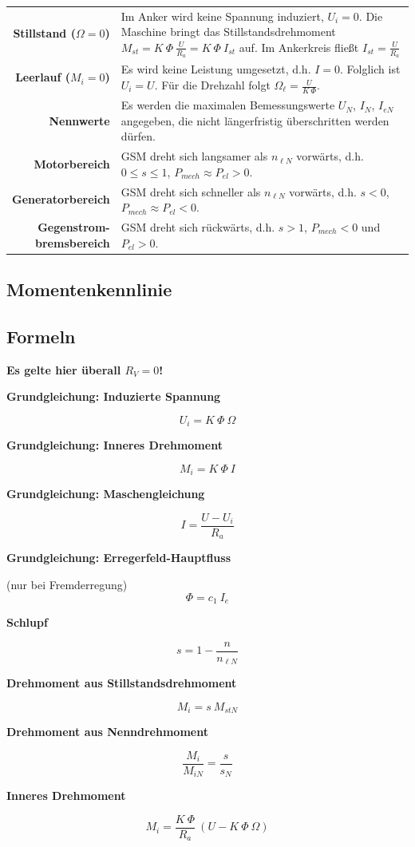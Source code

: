 \documentclass[11pt]{article}
\newcommand{\fancyformula}[2]{
	\small
	\raggedright\sffamily\textbf{#1}
	#2
}
\begin{document}
\begin{center}
\bgroup
\begin{longtable}{r p{12cm}}
	\textbf{Stillstand ($\Omega = 0$)} & Im Anker wird keine Spannung induziert, $U_i = 0$. Die Maschine bringt das Stillstandsdrehmoment $M_{st} = K ~ \Phi ~ \frac{U}{R_a} = K ~ \Phi ~ I_{st}$ auf. Im Ankerkreis fließt $I_{st} = \frac{U}{R_a}$ \\
	\textbf{Leerlauf ($M_i = 0$)} & Es wird keine Leistung umgesetzt, d.h. $I = 0$. Folglich ist $U_i = U$. Für die Drehzahl folgt $\Omega_\ell = \frac{U}{K ~ \Phi}$. \\
	\textbf{Nennwerte} & Es werden die maximalen Bemessungswerte $U_N$, $I_N$, $I_{eN}$ angegeben, die nicht längerfristig überschritten werden dürfen. \\
	\textbf{Motorbereich} & GSM dreht sich langsamer als $n_{\ell N}$ vorwärts, d.h. $0 \leq s \leq 1$, $P_{mech} \approx P_{el} > 0$. \\
	\textbf{Generatorbereich} & GSM dreht sich schneller als $n_{\ell N}$ vorwärts, d.h. $s < 0$, $P_{mech} \approx P_{el} < 0$. \\
	\pbox{20cm}{\textbf{Gegenstrom-} \\ \textbf{bremsbereich}} & GSM dreht sich rückwärts, d.h. $s > 1$, $P_{mech} < 0$ und $P_{el} > 0$.
\end{longtable}
\egroup
\end{center}

\subsection*{Momentenkennlinie}

\subsection*{Formeln}
\textbf{Es gelte hier überall $R_V = 0$!}

\begin{multicols}{2}
\fancyformula{Grundgleichung: Induzierte Spannung}{
	\[
		U_i = K ~ \Phi ~ \Omega
	\]
}

\fancyformula{Grundgleichung: Inneres Drehmoment}{
	\[
		M_i = K ~ \Phi ~ I
	\]
}

\fancyformula{Grundgleichung: Maschengleichung}{
	\[
		I = \frac{U - U_i}{R_a}
	\]
}

\fancyformula{Grundgleichung: Erregerfeld-Hauptfluss}{
	(nur bei Fremderregung)
	\[
		\Phi = c_1 ~ I_e
	\]
}

\fancyformula{Schlupf}{
	\[
		s = 1 - \frac{n}{n_{\ell N}}
	\]
}

\fancyformula{Drehmoment aus Stillstandsdrehmoment}{
	\[
		M_i = s ~ M_{stN}
	\]
}

\fancyformula{Drehmoment aus Nenndrehmoment}{
	\[
		\frac{M_i}{M_{iN}} = \frac{s}{s_N}
	\]
}

\fancyformula{Inneres Drehmoment}{
	\[
		M_i = \frac{K ~ \Phi}{R_a} ~ (U - K ~ \Phi ~ \Omega)
	\]
}

\end{multicols}
\end{document}
